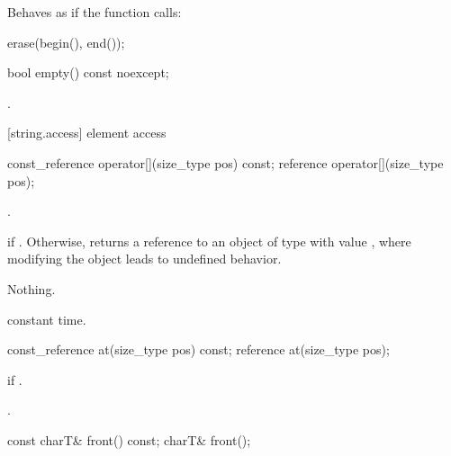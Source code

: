 \begin{itemdescr}
\pnum
\effects
Behaves as if the function calls:

\begin{codeblock}
erase(begin(), end());
\end{codeblock}
\end{itemdescr}

%
%
\begin{itemdecl}
bool empty() const noexcept;
\end{itemdecl}

\begin{itemdescr}
\pnum
\returns
{}.
\end{itemdescr}

[string.access]{ element access}

%
%
\begin{itemdecl}
const_reference operator[](size_type pos) const;
reference       operator[](size_type pos);
\end{itemdecl}

\begin{itemdescr}
\pnum
\requires {}.

\pnum
\returns {} if . Otherwise,
returns a reference to an object of type  with value
, where modifying the object leads to
undefined behavior.

\pnum
\throws Nothing.

\pnum
\complexity constant time.
\end{itemdescr}

%
%
\begin{itemdecl}
const_reference at(size_type pos) const;
reference       at(size_type pos);
\end{itemdecl}

\begin{itemdescr}
\pnum
\throws
{}
if
.

\pnum
\returns
{}.
\end{itemdescr}

%
%
\begin{itemdecl}
const charT& front() const;
charT& front();
\end{itemdecl}

